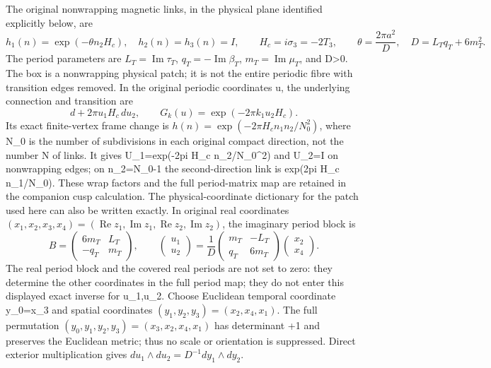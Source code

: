 \documentclass[
  11pt,
]{article}
\begin{document}
The original nonwrapping magnetic links, in the physical plane
identified explicitly below, are \[
 h_1(n)=\exp(-\theta n_2 H_c),\quad h_2(n)=h_3(n)=I,
 \qquad H_c=i\sigma_3=-2T_3,\qquad
 \theta=\frac{2\pi a^2}{D},\quad D=L_Tq_T+6m_T^2.
\tag{1.4}
\] The period parameters are \(L_T=\operatorname{Im}\tau_T\),
\(q_T=-\operatorname{Im}\beta_T\), \(m_T=\operatorname{Im}\mu_T\), and
D\textgreater0. The box is a nonwrapping physical patch; it is not the
entire periodic fibre with transition edges removed. In the original
periodic coordinates u, the underlying connection and transition are \[
 d+2\pi u_1H_c\,du_2,\qquad
 G_k(u)=\exp(-2\pi k_1u_2H_c).
\] Its exact finite-vertex frame change is
\(h(n)=\exp(-2\pi H_cn_1n_2/N_0^2)\), where N\_0 is the number of
subdivisions in each original compact direction, not the number N of
links. It gives U\_1=exp(-2pi H\_c n\_2/N\_0\^{}2) and U\_2=I on
nonwrapping edges; on n\_2=N\_0-1 the second-direction link is exp(2pi
H\_c n\_1/N\_0). These wrap factors and the full period-matrix map are
retained in the companion cusp calculation. The physical-coordinate
dictionary for the patch used here can also be written exactly. In
original real coordinates
\((x_1,x_2,x_3,x_4)=(\operatorname{Re}z_1,\operatorname{Im}z_1,
\operatorname{Re}z_2,\operatorname{Im}z_2)\), the imaginary period block
is \[
 B=\begin{pmatrix}6m_T&L_T\\-q_T&m_T\end{pmatrix},\qquad
 \begin{pmatrix}u_1\\u_2\end{pmatrix}
 =\frac1D\begin{pmatrix}m_T&-L_T\\q_T&6m_T\end{pmatrix}
       \begin{pmatrix}x_2\\x_4\end{pmatrix}.
\] The real period block and the covered real periods are not set to
zero: they determine the other coordinates in the full period map; they
do not enter this displayed exact inverse for u\_1,u\_2. Choose
Euclidean temporal coordinate y\_0=x\_3 and spatial coordinates
\((y_1,y_2,y_3)=(x_2,x_4,x_1)\). The full permutation
\((y_0,y_1,y_2,y_3)=(x_3,x_2,x_4,x_1)\) has determinant +1 and preserves
the Euclidean metric; thus no scale or orientation is suppressed. Direct
exterior multiplication gives \(du_1\wedge du_2=D^{-1}dy_1\wedge dy_2\).
\end{document}
